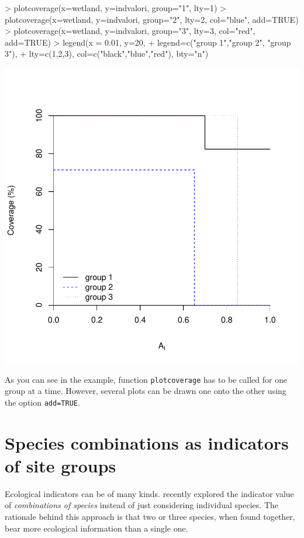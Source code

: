 \documentclass[11pt,a4paper]{article}
\begin{document}
\begin{center}
\begin{Schunk}
\begin{Sinput}
> plotcoverage(x=wetland, y=indvalori, group="1", lty=1)
> plotcoverage(x=wetland, y=indvalori, group="2", lty=2, col="blue", add=TRUE)
> plotcoverage(x=wetland, y=indvalori, group="3", lty=3, col="red", add=TRUE)
> legend(x = 0.01, y=20, 
+        legend=c("group 1","group 2", "group 3"),
+        lty=c(1,2,3), col=c("black","blue","red"), bty="n")
\end{Sinput}
\end{Schunk}
\includegraphics{indicspeciesTutorial-025}
\end{center}

As you can see in the example, function \texttt{plotcoverage} has to be called for one group at a time. However, several plots can be drawn one onto the other using the option \texttt{add=TRUE}.

\section{Species combinations as indicators of site groups}

Ecological indicators can be of many kinds. \citet{DeCaceres2012} recently explored the indicator value of \emph{combinations of species} instead of just considering individual species. The rationale behind this approach is that two or three species, when found together, bear more ecological information than a single one. 
\end{document}
